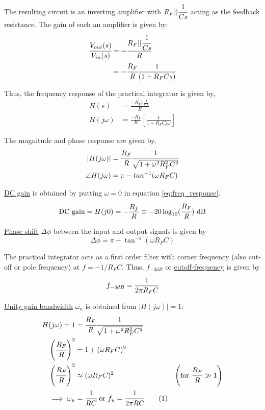 \documentclass[12pt, titlepage]{article}
\theoremstyle{definition}
\newcommand\numberthis{\addtocounter{equation}{1}\tag{\theequation}}
\begin{document}
    The resulting circuit is an inverting amplifier with $R_F||\cfrac{1}{Cs}$ acting as the feedback resistance.
    The gain of such an amplifier is given by:
    \begin{align*}
      \cfrac{V_{out}(s)}{V_{in}(s)} &= - \cfrac{R_F||\cfrac{1}{Cs}}{R}\\
      &= - \cfrac{R_F}{R} \cfrac{1}{(1 + R_F Cs)}
    \end{align*}

    Thus, the frequency response of the practical integrator is given by,
    \begin{align}
      H(s) &= \frac{-R_{F} || \frac{1}{Cs}}{R} \\
      H(j\omega) &= \frac{-R_{F}}{R} \left[ \frac{1}{1+R_{F}Cj\omega} \right] \label{eq:freq_response}
    \end{align}

    The magnitude and phase response are given by,
    \begin{align*}
    |H(j\omega)| &= \cfrac{R_{F}}{R}\cfrac{1}{\sqrt{1+\omega^{2}R_{F}^{2}C^{2}}} \\
    \angle H(j\omega) &= \pi - tan^{-1}(\omega R_{F}C)
    \end{align*}

    \underline{DC gain} is obtained by putting $\omega = 0$ in equation \ref{eq:freq_response}.
    \begin{equation}
      \text{DC gain} = H(j0) = -\frac{R_f}{R} \equiv -20\log_{10}(\cfrac{R_F}{R}) \text{ dB}
    \end{equation}

    \underline{Phase shift} $\Delta\phi$ between the input and output signals is given by
    \begin{equation}\label{eq:phase_shift}
      \Delta\phi = \pi - \tan^{-1}(\omega R_FC)
    \end{equation}

    The practical integrator acts as a first order filter with corner frequency (also cut-off or pole frequency) at $f = -1/R_FC$.
    Thus, \underline{$f_{-3dB}$} or \underline{cutoff-frequency} is given by
    \begin{equation}\label{eq:f3db}
      f_{-3dB} = \cfrac{1}{2\pi R_FC}
    \end{equation}

    \underline{Unity gain bandwidth} $\omega_u$ is obtained from $|H(j\omega)| = 1$:
    \begin{align*}
      H(j\omega) = 1 &= \cfrac{R_{F}}{R}\cfrac{1}{\sqrt{1+\omega^{2}R_{F}^{2}C^{2}}} \\
      \left(\cfrac{R_F}{R}\right)^2 &= 1 + (\omega R_FC)^2 \\
      \left(\cfrac{R_F}{R}\right)^2 &\approx (\omega R_FC)^2 & \left(\text{for } \cfrac{R_F}{R} \gg 1\right)\\
      \implies \omega_u &= \cfrac{1}{RC} \text{ or } f_u = \cfrac{1}{2\pi RC}\numberthis \label{eq:unity_gain_bw}
    \end{align*}
\end{document}
